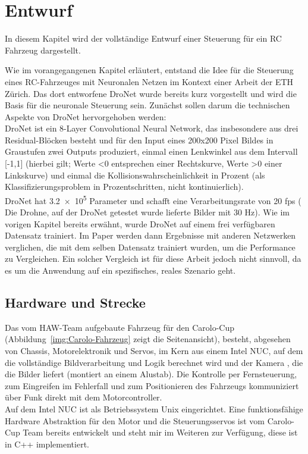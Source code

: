 %
\chapter{Entwurf}
In diesem Kapitel wird der vollständige Entwurf einer Steuerung für ein RC Fahrzeug dargestellt.

Wie im vorangegangenen Kapitel erläutert, entstand die Idee für die Steuerung eines RC-Fahrzeuges mit Neuronalen Netzen im Kontext einer Arbeit der ETH Zürich.
Das dort entworfene DroNet wurde bereits kurz vorgestellt und wird die Basis für die neuronale Steuerung sein. Zunächst sollen darum die technischen Aspekte von DroNet hervorgehoben werden: \\

DroNet ist ein 8-Layer Convolutional Neural Network, das insbesondere aus drei Residual-Blöcken besteht und für den Input eines 200x200 Pixel Bildes in Graustufen zwei Outputs produziert, einmal einen Lenkwinkel aus dem Intervall [-1,1] (hierbei gilt; Werte <0 entsprechen einer Rechtskurve, Werte >0 einer Linkskurve)  und einmal die Kollisionswahrscheinlichkeit in Prozent (als Klassifizierungsproblem in Prozentschritten, nicht kontinuierlich).\\
DroNet hat \num{3.2e5} Parameter und schafft eine Verarbeitungsrate von 20 fps ( Die Drohne, auf der DroNet getestet wurde lieferte Bilder mit 30 Hz).
Wie im vorigen Kapitel bereits erwähnt, wurde DroNet auf einem frei verfügbaren Datensatz trainiert. Im Paper werden dann Ergebnisse mit anderen Netzwerken verglichen, die mit dem selben Datensatz trainiert wurden, um die Performance zu Vergleichen. Ein solcher Vergleich ist für diese Arbeit jedoch nicht sinnvoll, da es um die Anwendung auf ein spezifisches, reales Szenario geht. 

\section{Hardware und Strecke}

Das vom HAW-Team aufgebaute Fahrzeug für den Carolo-Cup (Abbildung~\ref{img:Carolo-Fahrzeug} zeigt die Seitenansicht), besteht, abgesehen von Chassis, Motorelektronik und Servos, im Kern aus einem Intel NUC, auf dem die vollständige Bildverarbeitung und Logik berechnet wird und der Kamera , die die Bilder liefert (montiert an einem Alustab). Die Kontrolle per Fernsteuerung, zum Eingreifen im Fehlerfall und zum Positionieren des Fahrzeugs kommuniziert über Funk direkt mit dem Motorcontroller.\\
Auf dem Intel NUC ist als Betriebssystem Unix eingerichtet.
Eine funktionsfähige Hardware Abstraktion für den Motor und die Steuerungsservos ist vom Carolo-Cup Team bereits entwickelt und steht mir im Weiteren zur Verfügung, diese ist in C++ implementiert.\\

